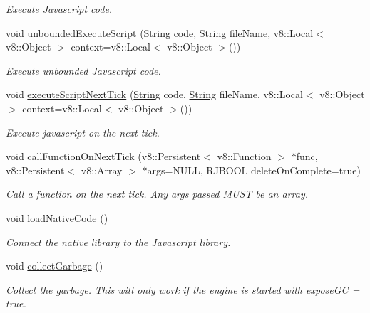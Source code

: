 \begin{DoxyCompactItemize}
\begin{DoxyCompactList}\small\item\em Execute Javascript code. \end{DoxyCompactList}\item 
void \mbox{\hyperlink{class_rad_j_a_v_1_1_v8_javascript_engine_af5d6bcaa4575a6a1f724029365139c65}{unbounded\+Execute\+Script}} (\mbox{\hyperlink{class_rad_j_a_v_1_1_string}{String}} code, \mbox{\hyperlink{class_rad_j_a_v_1_1_string}{String}} file\+Name, v8\+::\+Local$<$ v8\+::\+Object $>$ context=v8\+::\+Local$<$ v8\+::\+Object $>$())
\begin{DoxyCompactList}\small\item\em Execute unbounded Javascript code. \end{DoxyCompactList}\item 
void \mbox{\hyperlink{class_rad_j_a_v_1_1_v8_javascript_engine_ad3054e8230802a30234d00f1df067701}{execute\+Script\+Next\+Tick}} (\mbox{\hyperlink{class_rad_j_a_v_1_1_string}{String}} code, \mbox{\hyperlink{class_rad_j_a_v_1_1_string}{String}} file\+Name, v8\+::\+Local$<$ v8\+::\+Object $>$ context=v8\+::\+Local$<$ v8\+::\+Object $>$())
\begin{DoxyCompactList}\small\item\em Execute javascript on the next tick. \end{DoxyCompactList}\item 
void \mbox{\hyperlink{class_rad_j_a_v_1_1_v8_javascript_engine_aa282f0464eebfd2a9ae53aea94853870}{call\+Function\+On\+Next\+Tick}} (v8\+::\+Persistent$<$ v8\+::\+Function $>$ $\ast$func, v8\+::\+Persistent$<$ v8\+::\+Array $>$ $\ast$args=N\+U\+LL, R\+J\+B\+O\+OL delete\+On\+Complete=true)
\begin{DoxyCompactList}\small\item\em Call a function on the next tick. Any args passed M\+U\+ST be an array. \end{DoxyCompactList}\item 
void \mbox{\hyperlink{class_rad_j_a_v_1_1_v8_javascript_engine_afd8d4baa780d5ee7a77754eb5ca52e4d}{load\+Native\+Code}} ()
\begin{DoxyCompactList}\small\item\em Connect the native library to the Javascript library. \end{DoxyCompactList}\item 
void \mbox{\hyperlink{class_rad_j_a_v_1_1_v8_javascript_engine_ab9624aca14bbbcb2bb248d81efe8e402}{collect\+Garbage}} ()
\begin{DoxyCompactList}\small\item\em Collect the garbage. This will only work if the engine is started with expose\+GC = true. \end{DoxyCompactList}\item 

\end{DoxyCompactItemize}
